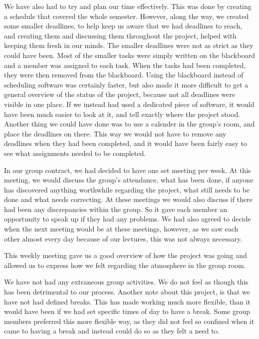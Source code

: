 We have also had to try and plan our time effectively. 
This was done by creating a schedule that covered the whole semester. 
However, along the way, we created some smaller deadlines, to help keep us aware that we had deadlines to reach, and creating them and discussing them throughout the project, helped with keeping them fresh in our minds.
The smaller deadlines were not as strict as they could have been. 
Most of the smaller tasks were simply written on the blackboard and a member was assigned to each task. 
When the tasks had been completed, they were then removed from the blackboard.
Using the blackboard instead of scheduling software was certainly faster, but also made it more difficult to get a general overview of the status of the project, because not all deadlines were visible in one place.
If we instead had used a dedicated piece of software, it would have been much easier to look at it, and tell exactly where the project stood. 
Another thing we could have done was to use a calender in the group's room, and place the deadlines on there. 
This way we would not have to remove any deadlines when they had been completed, and it would have been fairly easy to see what assignments needed to be completed.

In our group contract, we had decided to have one set meeting per week.
At this meeting, we would discuss the group's attendance, what has been done, if anyone has discovered anything worthwhile regarding the project, what still needs to be done and what needs correcting. 
At these meetings we would also discuss if there had been any discrepancies within the group.
So it gave each member an opportunity to speak up if they had any problems.
We had also agreed to decide when the next meeting would be at these meetings, however, as we saw each other almost every day because of our lectures, this was not always necessary.

This weekly meeting gave us a good overview of how the project was going and allowed us to express how we felt regarding the atmosphere in the group room. 

We have not had any extraneous group activities. 
We do not feel as though this has been detrimental to our process.
Another note about this project, is that we have not had defined breaks. 
This has made working much more flexible, than it would have been if we had set specific times of day to have a break. 
Some group members preferred this more flexible way, as they did not feel so confined when it came to having a break and instead could do so as they felt a need to.

